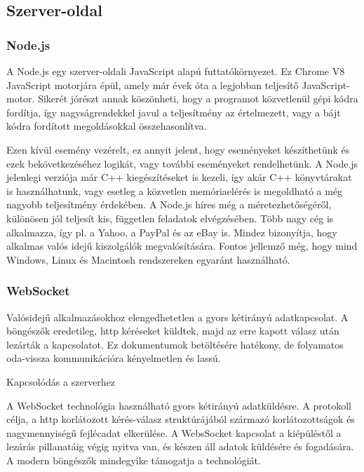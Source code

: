 \documentclass[]{article}
\begin{document}
\subsection{Szerver-oldal}


\subsubsection{Node.js}

A Node.js egy szerver-oldali JavaScript alapú futtatókörnyezet. Ez
Chrome V8 JavaScript motorjára épül, amely már évek óta a legjobban
teljesítő JavaScript-motor. Sikerét jórészt annak köszönheti, hogy a
programot közvetlenül gépi kódra fordítja, így nagyságrendekkel javul a
teljesítmény az értelmezett, vagy a bájt kódra fordított megoldásokkal
összehasonlítva.

Ezen kívül esemény vezérelt, ez annyit jelent, hogy eseményeket
készíthetünk és ezek bekövetkezéséhez logikát, vagy további eseményeket
rendelhetünk. A Node.js jelenlegi verziója már C++ kiegészítéseket is
kezeli, így akár C++ könyvtárakat is használhatunk, vagy esetleg a
közvetlen memóriaelérés is megoldható a még nagyobb teljesítmény
érdekében. A Node.js híres még a méretezhetőségéről, különösen jól
teljesít kis, független feladatok elvégzésében. Több nagy cég is
alkalmazza, így pl. a Yahoo, a PayPal és az eBay is. Mindez bizonyítja,
hogy alkalmas valós idejű kiszolgálók megvalósítására. Fontos jellemző
még, hogy mind Windows, Linux és Macintosh rendszereken egyaránt
használható.


\subsubsection{WebSocket}

Valósidejű alkalmazásokhoz elengedhetetlen a gyors kétirányú
adatkapcsolat. A böngészők eredetileg, http kéréseket küldtek, majd az
erre kapott válasz után lezárták a kapcsolatot. Ez dokumentumok
betöltésére hatékony, de folyamatos oda-vissza kommunikációra
kényelmetlen és lassú.

Kapcsolódás a szerverhez

A WebSocket technológia használható gyors kétirányú adatküldésre. A
protokoll célja, a http korlátozott kérés-válasz struktúrájából származó
korlátozottságok és nagymennyiségű fejlécadat elkerülése. A WebsSocket
kapcsolat a kiépüléstől a lezárás pillanatáig végig nyitva van, és
készen áll adatok küldésére és fogadására. A modern böngészők mindegyike
támogatja a technológiát.
\end{document}
